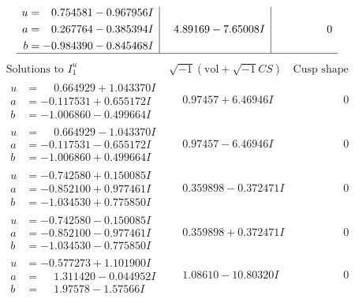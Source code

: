 \documentclass[1p]{elsarticle_modified}
\theoremstyle{definition}
\newcommand{\I}{\sqrt{-1}}
\begin{document}
$$\begin{array}{c|c|c}
\begin{aligned}
u &= \phantom{-}0.754581 - 0.967956 I \\
a &= \phantom{-}0.267764 - 0.385394 I \\
b &= -0.984390 - 0.845468 I\end{aligned}
 & \phantom{-}4.89169 - 7.65008 I & \phantom{-0.000000 } 0\\
 \hline 
 \end{array}$$\newpage$$\begin{array}{c|c|c}  
\text{Solutions to }I^u_{1}& \I (\text{vol} + \sqrt{-1}CS) & \text{Cusp shape}\\
 \hline 
\begin{aligned}
u &= \phantom{-}0.664929 + 1.043370 I \\
a &= -0.117531 + 0.655172 I \\
b &= -1.006860 - 0.499664 I\end{aligned}
 & \phantom{-}0.97457 + 6.46946 I & \phantom{-0.000000 } 0 \\ \hline\begin{aligned}
u &= \phantom{-}0.664929 - 1.043370 I \\
a &= -0.117531 - 0.655172 I \\
b &= -1.006860 + 0.499664 I\end{aligned}
 & \phantom{-}0.97457 - 6.46946 I & \phantom{-0.000000 } 0 \\ \hline\begin{aligned}
u &= -0.742580 + 0.150085 I \\
a &= -0.852100 + 0.977461 I \\
b &= -1.034530 + 0.775850 I\end{aligned}
 & \phantom{-}0.359898 - 0.372471 I & \phantom{-0.000000 } 0 \\ \hline\begin{aligned}
u &= -0.742580 - 0.150085 I \\
a &= -0.852100 - 0.977461 I \\
b &= -1.034530 - 0.775850 I\end{aligned}
 & \phantom{-}0.359898 + 0.372471 I & \phantom{-0.000000 } 0 \\ \hline\begin{aligned}
u &= -0.577273 + 1.101900 I \\
a &= \phantom{-}1.311420 - 0.044952 I \\
b &= \phantom{-}1.97578 - 1.57566 I\end{aligned}
 & \phantom{-}1.08610 - 10.80320 I & \phantom{-0.000000 } 0 \\ \hline\begin{aligned}

\end{aligned}
\end{array}$$
\end{document}
